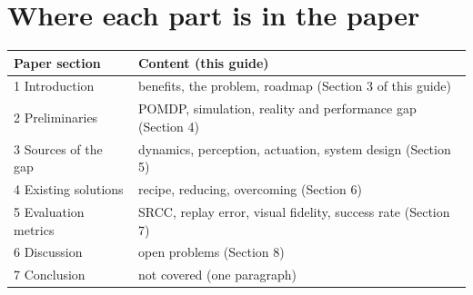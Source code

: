 \documentclass[11pt,a4paper]{article}
\begin{document}
\section{Where each part is in the paper}
\begin{center}
\renewcommand{\arraystretch}{1.2}
\begin{tabularx}{\textwidth}{@{}l X@{}}
\toprule
Paper section & Content (this guide) \\
\midrule
1 Introduction & benefits, the problem, roadmap (Section 3 of this guide) \\
2 Preliminaries & POMDP, simulation, reality and performance gap (Section 4) \\
3 Sources of the gap & dynamics, perception, actuation, system design (Section 5) \\
4 Existing solutions & recipe, reducing, overcoming (Section 6) \\
5 Evaluation metrics & SRCC, replay error, visual fidelity, success rate (Section 7) \\
6 Discussion & open problems (Section 8) \\
7 Conclusion & not covered (one paragraph) \\
\bottomrule
\end{tabularx}
\end{center}
\end{document}
